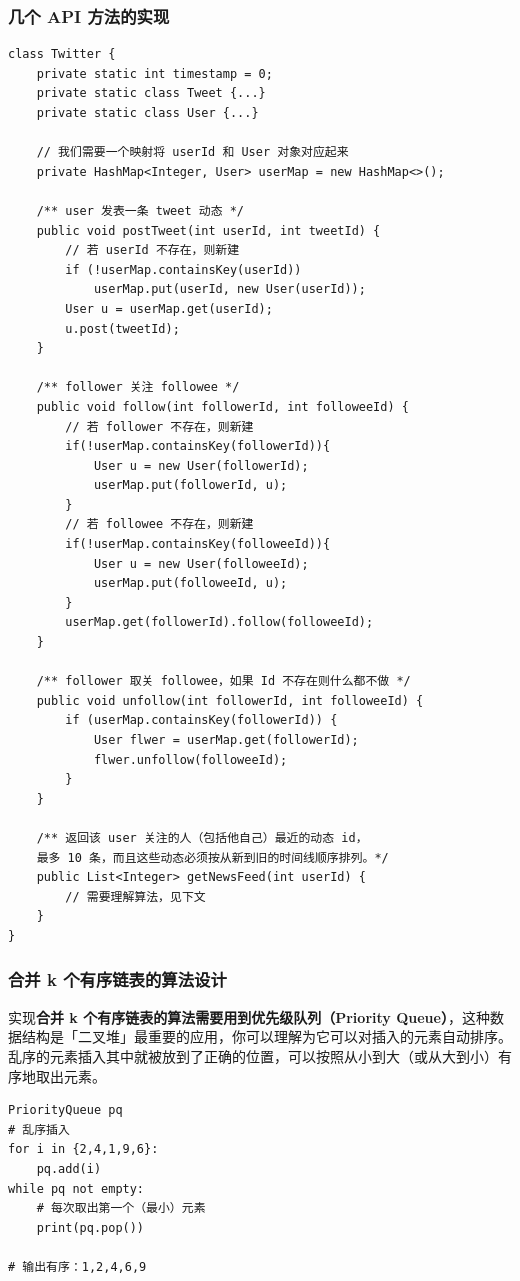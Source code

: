 \documentclass[12pt]{article}
\begin{document}
\subsubsection{几个 API 方法的实现}
\begin{lstlisting}
class Twitter {
    private static int timestamp = 0;
    private static class Tweet {...}
    private static class User {...}

    // 我们需要一个映射将 userId 和 User 对象对应起来
    private HashMap<Integer, User> userMap = new HashMap<>();

    /** user 发表一条 tweet 动态 */
    public void postTweet(int userId, int tweetId) {
        // 若 userId 不存在，则新建
        if (!userMap.containsKey(userId))
            userMap.put(userId, new User(userId));
        User u = userMap.get(userId);
        u.post(tweetId);
    }
    
    /** follower 关注 followee */
    public void follow(int followerId, int followeeId) {
        // 若 follower 不存在，则新建
		if(!userMap.containsKey(followerId)){
			User u = new User(followerId);
			userMap.put(followerId, u);
		}
        // 若 followee 不存在，则新建
		if(!userMap.containsKey(followeeId)){
			User u = new User(followeeId);
			userMap.put(followeeId, u);
		}
		userMap.get(followerId).follow(followeeId);
    }
    
    /** follower 取关 followee，如果 Id 不存在则什么都不做 */
    public void unfollow(int followerId, int followeeId) {
        if (userMap.containsKey(followerId)) {
            User flwer = userMap.get(followerId);
            flwer.unfollow(followeeId);
        }
    }

    /** 返回该 user 关注的人（包括他自己）最近的动态 id，
    最多 10 条，而且这些动态必须按从新到旧的时间线顺序排列。*/
    public List<Integer> getNewsFeed(int userId) {
        // 需要理解算法，见下文
    }
}
\end{lstlisting}

\subsubsection{合并 k 个有序链表的算法设计}
实现\textbf{合并 k 个有序链表的算法需要用到优先级队列（Priority Queue）}，这种数据结构是「二叉堆」最重要的应用，你可以理解为它可以对插入的元素自动排序。乱序的元素插入其中就被放到了正确的位置，可以按照从小到大（或从大到小）有序地取出元素。
\begin{lstlisting}
PriorityQueue pq
# 乱序插入
for i in {2,4,1,9,6}:
    pq.add(i)
while pq not empty:
    # 每次取出第一个（最小）元素
    print(pq.pop())

# 输出有序：1,2,4,6,9
\end{lstlisting}
\end{document}
